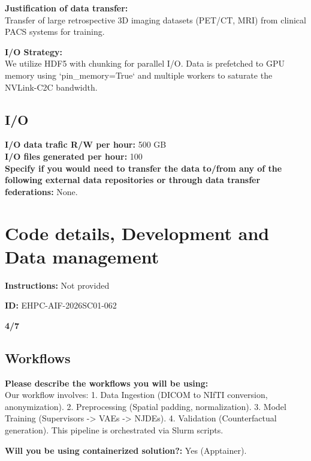\documentclass[11pt, a4paper]{article}
\begin{document}
\vspace{0.5em}
\noindent\textbf{Justification of data transfer:} \\
Transfer of large retrospective 3D imaging datasets (PET/CT, MRI) from clinical PACS systems for training.

\vspace{0.5em}
\noindent\textbf{I/O Strategy:} \\
We utilize HDF5 with chunking for parallel I/O. Data is prefetched to GPU memory using `pin_memory=True` and multiple workers to saturate the NVLink-C2C bandwidth.

\subsection*{I/O}

\noindent\textbf{I/O data trafic R/W per hour:} 500 GB \\
\textbf{I/O files generated per hour:} 100 \\
\textbf{Specify if you would need to transfer the data to/from any of the following external data repositories or through data transfer federations:} None.

\section*{Code details, Development and Data management}

\noindent\textbf{Instructions:} Not provided

\vspace{0.5em}
\noindent\textbf{ID:} EHPC-AIF-2026SC01-062

\vspace{0.5em}
\noindent\textbf{4/7}

\subsection*{Workflows}

\noindent\textbf{Please describe the workflows you will be using:} \\
Our workflow involves: 1. Data Ingestion (DICOM to NIfTI conversion, anonymization). 2. Preprocessing (Spatial padding, normalization). 3. Model Training (Supervisors -> VAEs -> NJDEs). 4. Validation (Counterfactual generation). This pipeline is orchestrated via Slurm scripts.

\vspace{0.5em}
\noindent\textbf{Will you be using containerized solution?:} Yes (Apptainer).
\end{document}
